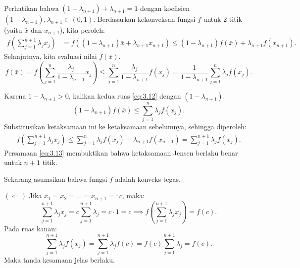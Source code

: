 \documentclass[aspectratio=169,11pt]{beamer}
\theoremstyle{definition}
\begin{document}
\begin{frame}[allowframebreaks]{\insertsection}{\insertsubsection}
\begin{itemize}
          Perhatikan bahwa $(1 - \lambda_{n+1}) + \lambda_{n+1} = 1$ dengan koefisien $(1 - \lambda_{n+1}), \lambda_{n+1} \in (0,1)$. Berdasarkan kekonveksan fungsi $f$ untuk 2 titik (yaitu $\bar{x}$ dan $x_{n+1}$), kita peroleh:
          \begin{align*}
            f\left( \sum_{j=1}^{n+1} \lambda_j x_j \right) & = f\left( (1 - \lambda_{n+1}) \bar{x} + \lambda_{n+1} x_{n+1} \right) \leq (1 - \lambda_{n+1}) f(\bar{x}) + \lambda_{n+1} f(x_{n+1}).
          \end{align*}
          Selanjutnya, kita evaluasi nilai $f(\bar{x})$.
          \begin{equation}
            f(\bar{x}) = f\left( \sum_{j=1}^n \frac{\lambda_j}{1 - \lambda_{n+1}} x_j \right) \leq \sum_{j=1}^n \frac{\lambda_j}{1 - \lambda_{n+1}} f(x_j) = \frac{1}{1 - \lambda_{n+1}} \sum_{j=1}^n \lambda_j f(x_j). \label{eq:3.12}
          \end{equation}

          Karena $1 - \lambda_{n+1} > 0$, kalikan kedua ruas \eqref{eq:3.12} dengan $(1 - \lambda_{n+1})$:
          \begin{equation*}
            (1 - \lambda_{n+1}) f(\bar{x}) \leq \sum_{j=1}^n \lambda_j f(x_j).
          \end{equation*}
          Substitusikan ketaksamaan ini ke ketaksamaan sebelumnya, sehingga diperoleh:
          \begin{align}
            f\left( \sum_{j=1}^{n+1} \lambda_j x_j \right) \leq \sum_{j=1}^n \lambda_j f(x_j) + \lambda_{n+1} f(x_{n+1}) = \sum_{j=1}^{n+1} \lambda_j f(x_j). \label{eq:3.13}
          \end{align}
          Persamaan \eqref{eq:3.13} membuktikan bahwa ketaksamaan Jensen berlaku benar untuk $n + 1$ titik.
  \end{itemize}
  Sekarang asumsikan bahwa fungsi $f$ adalah konveks tegas.

  $(\Leftarrow)$ Jika $x_1 = x_2 = \dots = x_{n+1} =: c$, maka:
  \begin{equation*}
    \sum_{j=1}^{n+1} \lambda_j x_j = c \sum_{j=1}^{n+1} \lambda_j = c \cdot 1 = c \implies f\left( \sum_{j=1}^{n+1} \lambda_j x_j \right) = f(c).
  \end{equation*}
  Pada ruas kanan:
  \begin{equation*}
    \sum_{j=1}^{n+1} \lambda_j f(x_j) = \sum_{j=1}^{n+1} \lambda_j f(c) = f(c) \sum_{j=1}^{n+1} \lambda_j = f(c).
  \end{equation*}
  Maka tanda kesamaan jelas berlaku.


\end{frame}
\end{document}
